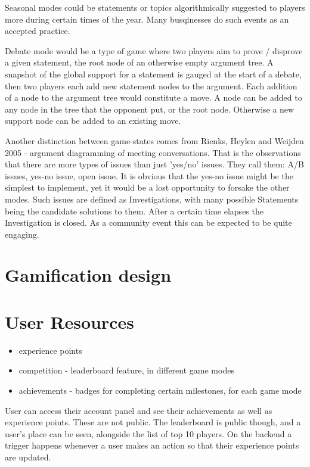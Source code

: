 \documentclass{report}
\begin{document}
Seasonal modes could be statements or topics algorithmically suggested to players more during certain times of the year. Many busqinesses do such events as an accepted practice.

Debate mode would be a type of game where two players aim to prove / disprove a given statement, the root node of an otherwise empty argument tree.  A snapshot of the global support for a statement is gauged at the start of a debate, then two players each add new statement nodes to the argument. Each addition of a node to the argument tree would constitute a move.
A node can be added to any node in the tree that the opponent put, or the root node. Otherwise a new support node can be added to an existing move.

Another distinction between game-states comes from Rienks, Heylen and Weijden 2005 - argument diagramming of meeting conversations. That is the observations that there are more types of issues than just 'yes/no' issues. They call them: A/B issues, yes-no issue, open issue. It is obvious that the yes-no issue might be the simplest to implement, yet it would be a lost opportunity to forsake the other modes.
Such issues are defined as Investigations, with many possible Statements being the candidate solutions to them. After a certain time elapses the Investigation is closed. As a community event this can be expected to be quite engaging.

\section{Gamification design}

\section{User Resources}
\begin{itemize}
  \item experience points 
  \item competition - leaderboard feature, in different game modes
  \item achievements - badges for completing certain milestones, for each game mode
\end{itemize}

User can access their account panel and see their achievements as well as experience points. These are not public. The leaderboard is public though, and a user's place can be seen, alongside the list of top 10 players. On the backend a trigger happens whenever a user makes an action so that their experience points are updated.
\end{document}
